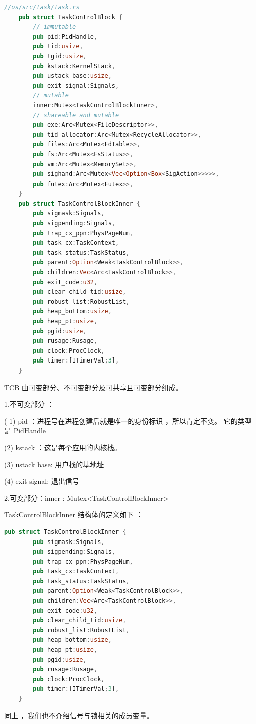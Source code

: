 \begin{lstlisting}[language=Rust]
	//os/src/task/task.rs
	pub struct TaskControlBlock {
		// immutable
		pub pid:PidHandle,
		pub tid:usize,
		pub tgid:usize,
		pub kstack:KernelStack,
		pub ustack_base:usize,
		pub exit_signal:Signals,
		// mutable
		inner:Mutex<TaskControlBlockInner>,
		// shareable and mutable
		pub exe:Arc<Mutex<FileDescriptor>>,
		pub tid_allocator:Arc<Mutex<RecycleAllocator>>,
		pub files:Arc<Mutex<FdTable>>,
		pub fs:Arc<Mutex<FsStatus>>,
		pub vm:Arc<Mutex<MemorySet>>,
		pub sighand:Arc<Mutex<Vec<Option<Box<SigAction>>>>>,
		pub futex:Arc<Mutex<Futex>>,
	}
	pub struct TaskControlBlockInner {
		pub sigmask:Signals,
		pub sigpending:Signals,
		pub trap_cx_ppn:PhysPageNum,
		pub task_cx:TaskContext,
		pub task_status:TaskStatus,
		pub parent:Option<Weak<TaskControlBlock>>,
		pub children:Vec<Arc<TaskControlBlock>>,
		pub exit_code:u32,
		pub clear_child_tid:usize,
		pub robust_list:RobustList,
		pub heap_bottom:usize,
		pub heap_pt:usize,
		pub pgid:usize,
		pub rusage:Rusage,
		pub clock:ProcClock,
		pub timer:[ITimerVal;3],
	}
\end{lstlisting}

TCB 由可变部分、不可变部分及可共享且可变部分组成。

1.不可变部分 ：

( 1) pid ：进程号在进程创建后就是唯一的身份标识 ，所以肯定不变。  
它的类型是 PidHandle 	

(2)   kstack ：这是每个应用的内核栈。

(3)  ustack base: 用户栈的基地址 

(4)  exit signal: 退出信号

2.可变部分：inner : Mutex<TaskControlBlockInner>

TaskControlBlockInner 结构体的定义如下 ：

\begin{lstlisting}[language=Rust]
	pub struct TaskControlBlockInner {
		pub sigmask:Signals,
		pub sigpending:Signals,
		pub trap_cx_ppn:PhysPageNum,
		pub task_cx:TaskContext,
		pub task_status:TaskStatus,
		pub parent:Option<Weak<TaskControlBlock>>,
		pub children:Vec<Arc<TaskControlBlock>>,
		pub exit_code:u32,
		pub clear_child_tid:usize,
		pub robust_list:RobustList,
		pub heap_bottom:usize,
		pub heap_pt:usize,
		pub pgid:usize,
		pub rusage:Rusage,
		pub clock:ProcClock,
		pub timer:[ITimerVal;3],
	}
\end{lstlisting}	

同上 ，我们也不介绍信号与锁相关的成员变量。

